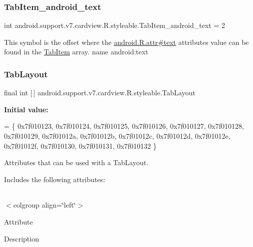 \subsubsection{\texorpdfstring{Tab\+Item\+\_\+android\+\_\+text}{TabItem\_android\_text}}
{\footnotesize\ttfamily int android.\+support.\+v7.\+cardview.\+R.\+styleable.\+Tab\+Item\+\_\+android\+\_\+text = 2\hspace{0.3cm}{\ttfamily [static]}}

This symbol is the offset where the \hyperlink{}{android.\+R.\+attr\#text} attribute\textquotesingle{}s value can be found in the \hyperlink{classandroid_1_1support_1_1v7_1_1cardview_1_1R_1_1styleable_ac405d1f61871d7d972e9ba19778ffd5c}{Tab\+Item} array.  name android\+:text \mbox{\label{classandroid_1_1support_1_1v7_1_1cardview_1_1R_1_1styleable_afa0dc9366603eaec9e38d99273ba8512}} 
\subsubsection{\texorpdfstring{Tab\+Layout}{TabLayout}}
{\footnotesize\ttfamily final int \mbox{[}$\,$\mbox{]} android.\+support.\+v7.\+cardview.\+R.\+styleable.\+Tab\+Layout\hspace{0.3cm}{\ttfamily [static]}}

{\bfseries Initial value\+:}
\begin{DoxyCode}
= \{
            0x7f010123, 0x7f010124, 0x7f010125, 0x7f010126,
            0x7f010127, 0x7f010128, 0x7f010129, 0x7f01012a,
            0x7f01012b, 0x7f01012c, 0x7f01012d, 0x7f01012e,
            0x7f01012f, 0x7f010130, 0x7f010131, 0x7f010132
        \}
\end{DoxyCode}
Attributes that can be used with a Tab\+Layout. 

Includes the following attributes\+:

\tabulinesep=1mm
\begin{longtabu} spread 0pt [c]{*{0}{|X[-1]}|}
\hline
\end{longtabu}
$<$colgroup align=\char`\"{}left\char`\"{}$>$ 

Attribute

Description 

